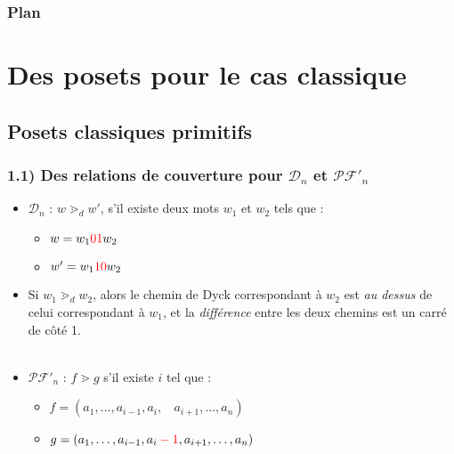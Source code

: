 \documentclass{beamer}
\begin{document}
\begin{frame} %
    \frametitle{Plan}
    \tableofcontents
\end{frame}

\section{Des posets pour le cas classique} %

\subsection{Posets classiques primitifs}

\begin{frame} %
    \frametitle{1.1) Des relations de couverture pour $\mathcal{D}_n$ et
        $\mathcal{PF'}_n$}
    \begin{itemize}
        \item $\mathcal{D}_n$ : $w \gtrdot_d w'$, s'il existe deux mots
            $w_1$ et $w_2$ tels que :
        \begin{itemize}
            \item $w = w_1\color{red}01\color{black}w_2$
            \item $w' = w_1\color{red}10\color{black}w_2$
        \end{itemize} 
        \item  Si $w_1 \gtrdot_d w_2$, alors le chemin de Dyck correspondant
        à $w_2$ est \emph{au dessus} de celui correspondant à $w_1$, et la
        \emph{différence} entre les deux chemins est un carré de côté 1.
        \\~\\
        \item $\mathcal{PF'}_n$ : $f \gtrdot g$ s'il existe $i$ tel que :
        \begin{itemize}
            \item $f = (a_1, \ldots, a_{i-1}, a_i,\ \ \ \ 
                a_{i+1}, \ldots, a_n)$
            \item $g = (a_1, \ldots, a_{i-1}, a_i \color{red} - 1\color{black}
                , a_{i+1}, \ldots, a_n)$
        \end{itemize}
    \end{itemize}
\end{frame}
\end{document}
